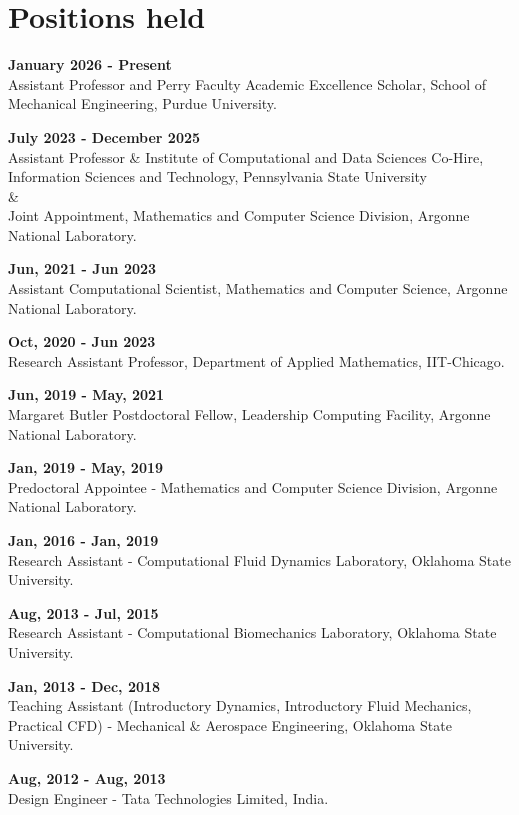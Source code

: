 \documentclass[letterpaper]{article}
\renewenvironment{itemize}{
  \begin{list}{}{
    \setlength{\leftmargin}{1.5em}
  }
}{
  \end{list}
}
\begin{document}
\section*{Positions held}
\begin{itemize}


\item \textbf{January 2026 - Present} \\ Assistant Professor and Perry Faculty Academic Excellence Scholar, School of Mechanical Engineering, Purdue University.

\item  \textbf{July 2023 - December 2025} \\ Assistant Professor \& Institute of Computational and Data Sciences Co-Hire, Information Sciences and Technology, Pennsylvania State University \\ \& \\ Joint Appointment, Mathematics and Computer Science Division, Argonne National Laboratory.

\item  \textbf{Jun, 2021 - Jun 2023} \\ Assistant Computational Scientist, Mathematics and Computer Science, Argonne National Laboratory.

\item \textbf{Oct, 2020 - Jun 2023} \\ Research Assistant Professor, Department of Applied Mathematics, IIT-Chicago.

\item \textbf{Jun, 2019 - May, 2021} \\ Margaret Butler Postdoctoral Fellow, Leadership Computing Facility, Argonne National Laboratory.

\item \textbf{Jan, 2019 - May, 2019} \\ Predoctoral Appointee - Mathematics and Computer Science Division, Argonne National Laboratory.  

\item \textbf{Jan, 2016 - Jan, 2019} \\ Research Assistant - Computational Fluid Dynamics Laboratory, Oklahoma State University. 

\item \textbf{Aug, 2013 - Jul, 2015} \\ Research Assistant - Computational Biomechanics Laboratory, Oklahoma State University. 

\item  \textbf{Jan, 2013 - Dec, 2018} \\ Teaching Assistant (Introductory Dynamics, Introductory Fluid Mechanics, Practical CFD) - Mechanical \& Aerospace Engineering, Oklahoma State University.

\item \textbf{Aug, 2012 - Aug, 2013} \\ Design Engineer - Tata Technologies Limited, India. 
\end{itemize}
\end{document}

